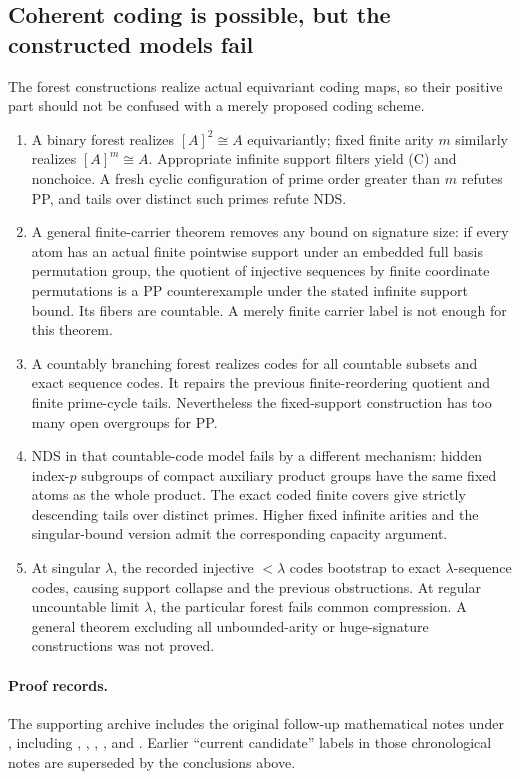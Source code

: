 \subsection{Coherent coding is possible, but the constructed models fail}
The forest constructions realize actual equivariant coding maps, so their positive part should not be confused with a merely proposed coding scheme.
\begin{enumerate}
\item A binary forest realizes $[A]^2\cong A$ equivariantly; fixed finite arity $m$ similarly realizes $[A]^m\cong A$. Appropriate infinite support filters yield (C) and nonchoice. A fresh cyclic configuration of prime order greater than $m$ refutes PP, and tails over distinct such primes refute NDS.
\item A general finite-carrier theorem removes any bound on signature size: if every atom has an actual finite pointwise support under an embedded full basis permutation group, the quotient of injective sequences by finite coordinate permutations is a PP counterexample under the stated infinite support bound. Its fibers are countable. A merely finite carrier label is not enough for this theorem.
\item A countably branching forest realizes codes for all countable subsets and exact sequence codes. It repairs the previous finite-reordering quotient and finite prime-cycle tails. Nevertheless the fixed-support construction has too many open overgroups for PP.
\item NDS in that countable-code model fails by a different mechanism: hidden index-$p$ subgroups of compact auxiliary product groups have the same fixed atoms as the whole product. The exact coded finite covers give strictly descending tails over distinct primes. Higher fixed infinite arities and the singular-bound version admit the corresponding capacity argument.
\item At singular $\lambda$, the recorded injective $<\lambda$ codes bootstrap to exact $\lambda$-sequence codes, causing support collapse and the previous obstructions. At regular uncountable limit $\lambda$, the particular forest fails common compression. A general theorem excluding all unbounded-arity or huge-signature constructions was not proved.
\end{enumerate}

\paragraph{Proof records.} The supporting archive includes the original follow-up mathematical notes under , including , , , ,  and . Earlier ``current candidate'' labels in those chronological notes are superseded by the conclusions above.


